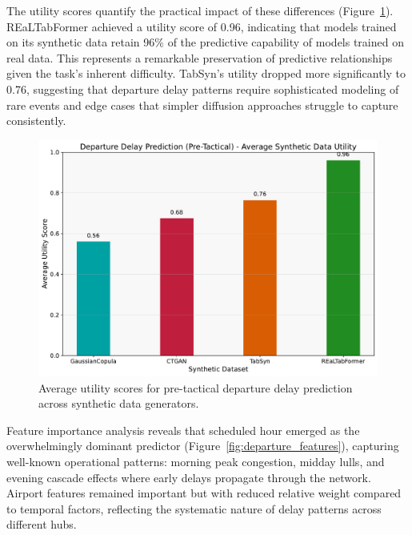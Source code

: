 \documentclass[conference]{IEEEtran}
\begin{document}
The utility scores quantify the practical impact of these differences (Figure~\ref{fig:departure_utility}). REaLTabFormer achieved a utility score of 0.96, indicating that models trained on its synthetic data retain 96\% of the predictive capability of models trained on real data. This represents a remarkable preservation of predictive relationships given the task's inherent difficulty. TabSyn's utility dropped more significantly to 0.76, suggesting that departure delay patterns require sophisticated modeling of rare events and edge cases that simpler diffusion approaches struggle to capture consistently.

\begin{figure}[htbp]
    \centering
    \includegraphics[width=0.8\linewidth]{plots/departure_delay_min_pre-tactical/departure_delay_min_pre-tactical_avg_utility.pdf}
    \caption{Average utility scores for pre-tactical departure delay prediction across synthetic data generators.}
    \label{fig:departure_utility}
\end{figure}

Feature importance analysis reveals that scheduled hour emerged as the overwhelmingly dominant predictor (Figure~\ref{fig:departure_features}), capturing well-known operational patterns: morning peak congestion, midday lulls, and evening cascade effects where early delays propagate through the network. Airport features remained important but with reduced relative weight compared to temporal factors, reflecting the systematic nature of delay patterns across different hubs.
\end{document}
